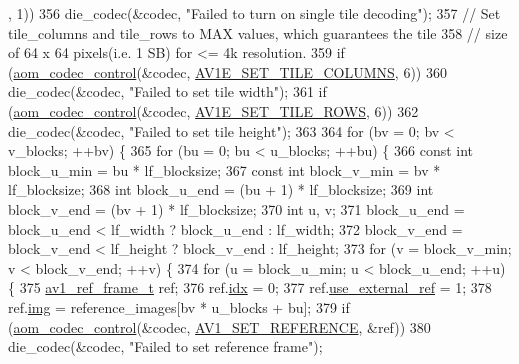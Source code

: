 \begin{DoxyCodeInclude}
{{{{{{{      , 1))
356     die\_codec(&codec, \textcolor{stringliteral}{"Failed to turn on single tile decoding"});
357   \textcolor{comment}{// Set tile\_columns and tile\_rows to MAX values, which guarantees the tile}
358   \textcolor{comment}{// size of 64 x 64 pixels(i.e. 1 SB) for <= 4k resolution.}
359   \textcolor{keywordflow}{if} (\hyperlink{group__codec_ga6da974f4eeaba1fa74106b28d0fe6ac5}{aom\_codec\_control}(&codec, \hyperlink{group__aom__encoder_ggae78dde67a6d78f332e9bdba0dde42db5acf4ab1ff2fa8d76a78881ad7f1a1294d}{AV1E\_SET\_TILE\_COLUMNS}, 6))
360     die\_codec(&codec, \textcolor{stringliteral}{"Failed to set tile width"});
361   \textcolor{keywordflow}{if} (\hyperlink{group__codec_ga6da974f4eeaba1fa74106b28d0fe6ac5}{aom\_codec\_control}(&codec, \hyperlink{group__aom__encoder_ggae78dde67a6d78f332e9bdba0dde42db5a57f2f2a54f593b398a5e97db7982f817}{AV1E\_SET\_TILE\_ROWS}, 6))
362     die\_codec(&codec, \textcolor{stringliteral}{"Failed to set tile height"});
363 
364   \textcolor{keywordflow}{for} (bv = 0; bv < v\_blocks; ++bv) \{
365     \textcolor{keywordflow}{for} (bu = 0; bu < u\_blocks; ++bu) \{
366       \textcolor{keyword}{const} \textcolor{keywordtype}{int} block\_u\_min = bu * lf\_blocksize;
367       \textcolor{keyword}{const} \textcolor{keywordtype}{int} block\_v\_min = bv * lf\_blocksize;
368       \textcolor{keywordtype}{int} block\_u\_end = (bu + 1) * lf\_blocksize;
369       \textcolor{keywordtype}{int} block\_v\_end = (bv + 1) * lf\_blocksize;
370       \textcolor{keywordtype}{int} u, v;
371       block\_u\_end = block\_u\_end < lf\_width ? block\_u\_end : lf\_width;
372       block\_v\_end = block\_v\_end < lf\_height ? block\_v\_end : lf\_height;
373       \textcolor{keywordflow}{for} (v = block\_v\_min; v < block\_v\_end; ++v) \{
374         \textcolor{keywordflow}{for} (u = block\_u\_min; u < block\_u\_end; ++u) \{
375           \hyperlink{structav1__ref__frame}{av1\_ref\_frame\_t} ref;
376           ref.\hyperlink{structav1__ref__frame_a7c6fcaba58f514985448cb2e2245345c}{idx} = 0;
377           ref.\hyperlink{structav1__ref__frame_a33749c5c20033cc5f7582d0ec1c34ff0}{use\_external\_ref} = 1;
378           ref.\hyperlink{structav1__ref__frame_a55a09db9e1acdd73e656b01fa01283b3}{img} = reference\_images[bv * u\_blocks + bu];
379           \textcolor{keywordflow}{if} (\hyperlink{group__codec_ga6da974f4eeaba1fa74106b28d0fe6ac5}{aom\_codec\_control}(&codec, \hyperlink{group__aom_gga9421a1fa78c0d9587ae5aa6c1cb3d659a51ad4467b4dc318406cceb257e2daa41}{AV1\_SET\_REFERENCE}, &ref))
380             die\_codec(&codec, \textcolor{stringliteral}{"Failed to set reference frame"});
}}}}}}}
\end{DoxyCodeInclude}
